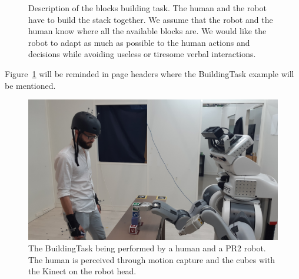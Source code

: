 \documentclass[a4paper,11pt,twoside]{StyleThese}
\begin{document}
\begin{figure}[!htb]
	\hspace*{\fill}%
	\hfill
	\hspace*{\fill}
	\caption{Description of the blocks building task. The human and the robot have to build the stack together. We assume that the robot and the human know where all the available blocks are. We would like the robot to adapt as much as possible to the human actions and decisions while avoiding useless or tiresome verbal interactions.}
	\label{chap6:fig:task_blocks}
\end{figure}

Figure~\ref{chap6:fig:task_blocks} will be reminded in page headers where the BuildingTask example will be mentioned.

\begin{figure}[!ht]
	\centering
	\includegraphics[width=0.7\linewidth]{figures/chapter2/building_task.jpg}
	\caption{The BuildingTask being performed by a human and a PR2 robot. The human is perceived through motion capture and the cubes with the Kinect on the robot head.}
	\label{chap6:fig:building_task}
\end{figure}
\end{document}

